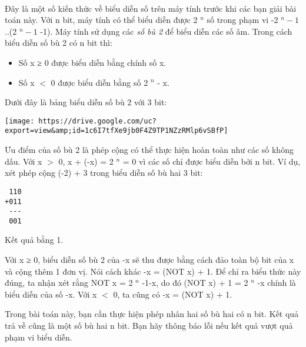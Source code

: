  

Đây là một số kiến thức về biểu diễn số trên máy tính trước khi các bạn giải bài toán này. Với n bit, máy tính có thể biểu diễn được 2 $^ n $ số trong phạm vi -2 $^ n-1 $ ..(2 $^ n-1 $ -1). Máy tính sử dụng các \emph{ số bù 2 } để biểu diễn các số âm. Trong cách biểu diễn số bù 2 có n bit thì:
\begin{itemize}
	\item Số x ≥ 0 được biểu diễn bằng chính số x.
	\item Số x $<$ 0 được biểu diễn bằng số 2 $^ n $ - x.
\end{itemize}

Dưới đây là bảng biểu diễn số bù 2 với 3 bit:


\texttt{[image: https://drive.google.com/uc?export=view\&amp;id=1c6I7tfXe9jb0F4Z9TP1NZzRMlp6vSBfP]}

Ưu điểm của số bù 2 là phép cộng có thể thực hiện hoàn toàn như các số không dấu. Với x $>$ 0, x + (-x) = 2 $^ n $ = 0 vì các số chỉ được biểu diễn bởi n bit. Ví dụ, xét phép cộng (-2) + 3 trong biểu diễn số bù hai 3 bit:
\begin{verbatim}
 110
+011
 ---
 001
\end{verbatim}

Kết quả bằng 1.

Với x ≥ 0, biểu diễn số bù 2 của -x sẽ thu được bằng cách đảo toàn bộ bit của x và cộng thêm 1 đơn vị. Nói cách khác -x = (NOT x) + 1. Để chỉ ra biểu thức này đúng, ta nhận xét rằng NOT x = 2 $^ n $ -1-x, do đó (NOT x) + 1 = 2 $^ n $ -x chính là biểu diễn của số -x. Với x $<$ 0, ta cũng có -x = (NOT x) + 1.

Trong bài toán này, bạn cần thực hiện phép nhân hai số bù hai có n bit. Kết quả trả về cũng là một số bù hai n bit. Bạn hãy thông báo lỗi nếu kết quả vượt quả phạm vi biểu diễn.

\